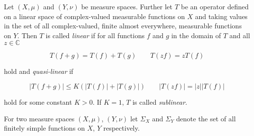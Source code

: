 \vspace{2mm}

\begin{mdframed}
	\begin{definition}
		Let $(X,\mu)$ and $(Y,\nu)$ be measure spaces. Further let $T$ be an operator defined on a linear space of complex-valued measurable functions on $X$ and taking values in the set of all complex-valued, finite almost everywhere, measurable functions on $Y$. Then $T$ is called \emph{linear} if for all functions $f$ and $g$ in the domain of $T$ and all $z \in \mathbb{C}$ 

		\begin{equation*}
			T\left( f + g \right) = T(f) + T(g) \qquad T\left( zf \right) = zT(f)
		\end{equation*}

		\noindent hold and \emph{quasi-linear} if

		\begin{equation*}
			\left| T\left( f + g \right) \right| \leq K \left( \left| T(f)\right| + \left| T(g)\right| \right) \qquad \left| T(zf) \right| = \left| z\right| \left| T(f)\right|
		\end{equation*}

		\noindent hold for some constant $K > 0$. If $K = 1$, $T$ is called \emph{sublinear}.
	\end{definition}
\end{mdframed}

\vspace{2mm}

For two measure spaces $\left( X,\mu \right)$, $\left( Y,\nu \right)$ let $\Sigma_X$ and $\Sigma_Y$ denote the set of all finitely simple functions on $X$, $Y$ respectively. 

\vspace{2mm}


